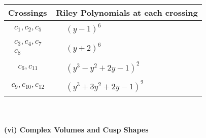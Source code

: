 \documentclass[1p]{elsarticle_modified}
\theoremstyle{definition}
\begin{document}
\begin{tabular}{m{50pt}|m{274pt}}
Crossings & \hspace{64pt}Riley Polynomials at each crossing \\
\hline $$\begin{aligned}c_{1},c_{2},c_{5}\end{aligned}$$&$\begin{aligned}
&(y-1)^6
\end{aligned}$\\
\hline $$\begin{aligned}c_{3},c_{4},c_{7}\\c_{8}\end{aligned}$$&$\begin{aligned}
&(y+2)^6
\end{aligned}$\\
\hline $$\begin{aligned}c_{6},c_{11}\end{aligned}$$&$\begin{aligned}
&(y^3- y^2+2 y-1)^2
\end{aligned}$\\
\hline $$\begin{aligned}c_{9},c_{10},c_{12}\end{aligned}$$&$\begin{aligned}
&(y^3+3 y^2+2 y-1)^2
\end{aligned}$\\
\hline
\end{tabular}\\~\\
\newpage\flushleft \textbf{(vi) Complex Volumes and Cusp Shapes}
\end{document}
